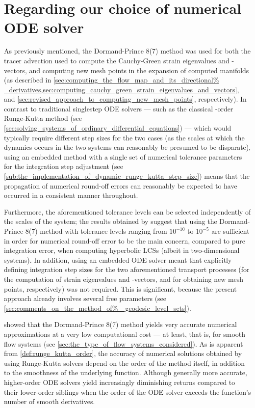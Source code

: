 \section{Regarding our choice of numerical ODE solver}
\label{sec:regarding_our_choice_of_numerical_ode_solver}

As previously mentioned, the Dormand-Prince 8(7) method was used for both the
tracer advection used to compute the Cauchy-Green strain eigenvalues and
-vectors, and computing new mesh points in the expansion of computed manifolds
(as described in \cref{sec:computing_the_flow_map_and_its_directional%
_derivatives,sec:computing_cauchy_green_strain_eigenvalues_and_vectors}, and
\cref{sec:revised_approach_to_computing_new_mesh_points}, respectively).
In contrast to traditional singlestep ODE solvers --- such as the classical
-order Runge-Kutta method (see
\cref{sec:solving_systems_of_ordinary_differential_equations}) --- which would
typically require different step sizes for the two cases (as the scales at which
the dynamics occurs in the two systems can reasonably be presumed to be
disparate), using an embedded method with a single set of numerical tolerance
parameters for the integration step adjustment (see
\cref{sub:the_implementation_of_dynamic_runge_kutta_step_size}) means that the
propagation of numerical round-off errors can reasonably be expected to have
occurred in a consistent manner throughout.

Furthermore, the aforementioned tolerance levels can be selected independently
of the scales of the system; the results obtained by
\textcite{loken2017sensitivity} suggest that using the Dormand-Prince 8(7)
method with tolerance levels ranging from $10^{-10}$ to $10^{-5}$ are
sufficient in order for numerical round-off error to be the main
concern, compared to pure integration error, when computing hyperbolic LCSs
(albeit in two-dimensional systems). In addition, using an embedded ODE
solver meant that explicitly defining integration step sizes for the
two aforementioned transport processes (for the computation of strain
eigenvalues and -vectors, and for obtaining new mesh points, respectively) was
not required. This is significant, because the present approach already
involves several free parameters (see \cref{sec:comments_on_the_method_of%
_geodesic_level_sets}).

\textcite{loken2017sensitivity} showed that the Dormand-Prince 8(7) method
yields very accurate numerical approximations at a very low computational cost
--- at least, that is, for smooth flow systems (see
\cref{sec:the_type_of_flow_systems_considered}). As is apparent from
\cref{def:runge_kutta_order}, the accuracy of numerical solutions obtained by
using Runge-Kutta solvers depend on the order of the method itself, in addition
to the smoothness of the underlying function. Although generally more accurate,
higher-order ODE solvers yield increasingly diminishing returns compared to
their lower-order siblings when the order of the ODE solver exceeds the
function's number of smooth derivatives.

